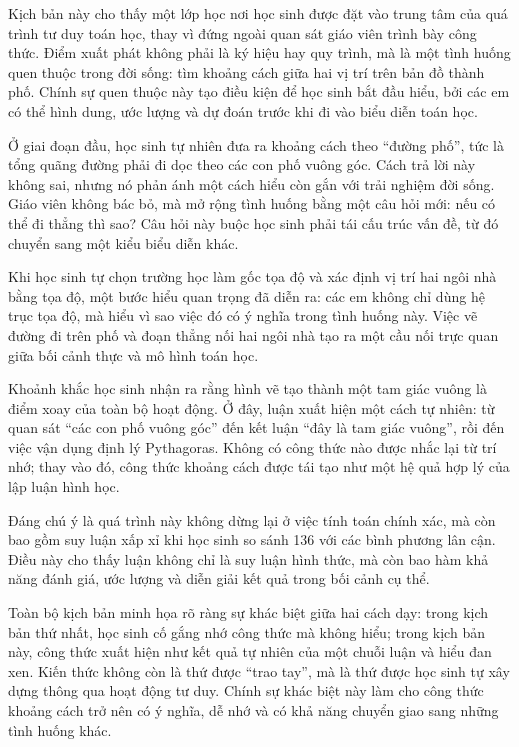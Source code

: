 \documentclass[
  10pt,
  a4paper,
  landscape,
  twoside,
  openany
]{scrbook}
\newcommand{\NOTE}[1]{#1}
\begin{document}
{
\NOTE{Kịch bản này cho thấy một lớp học nơi học sinh được đặt vào trung tâm của quá trình tư duy toán học, thay vì đứng ngoài quan sát giáo viên trình bày công thức. Điểm xuất phát không phải là ký hiệu hay quy trình, mà là một tình huống quen thuộc trong đời sống: tìm khoảng cách giữa hai vị trí trên bản đồ thành phố. Chính sự quen thuộc này tạo điều kiện để học sinh bắt đầu hiểu, bởi các em có thể hình dung, ước lượng và dự đoán trước khi đi vào biểu diễn toán học.

Ở giai đoạn đầu, học sinh tự nhiên đưa ra khoảng cách theo ``đường phố'', tức là tổng quãng đường phải đi dọc theo các con phố vuông góc. Cách trả lời này không sai, nhưng nó phản ánh một cách hiểu còn gắn với trải nghiệm đời sống. Giáo viên không bác bỏ, mà mở rộng tình huống bằng một câu hỏi mới: nếu có thể đi thẳng thì sao? Câu hỏi này buộc học sinh phải tái cấu trúc vấn đề, từ đó chuyển sang một kiểu biểu diễn khác.

Khi học sinh tự chọn trường học làm gốc tọa độ và xác định vị trí hai ngôi nhà bằng tọa độ, một bước hiểu quan trọng đã diễn ra: các em không chỉ dùng hệ trục tọa độ, mà hiểu vì sao việc đó có ý nghĩa trong tình huống này. Việc vẽ đường đi trên phố và đoạn thẳng nối hai ngôi nhà tạo ra một cầu nối trực quan giữa bối cảnh thực và mô hình toán học.

Khoảnh khắc học sinh nhận ra rằng hình vẽ tạo thành một tam giác vuông là điểm xoay của toàn bộ hoạt động. Ở đây, luận xuất hiện một cách tự nhiên: từ quan sát ``các con phố vuông góc'' đến kết luận ``đây là tam giác vuông'', rồi đến việc vận dụng định lý Pythagoras. Không có công thức nào được nhắc lại từ trí nhớ; thay vào đó, công thức khoảng cách được tái tạo như một hệ quả hợp lý của lập luận hình học.

Đáng chú ý là quá trình này không dừng lại ở việc tính toán chính xác, mà còn bao gồm suy luận xấp xỉ khi học sinh so sánh 136 với các bình phương lân cận. Điều này cho thấy luận không chỉ là suy luận hình thức, mà còn bao hàm khả năng đánh giá, ước lượng và diễn giải kết quả trong bối cảnh cụ thể.

Toàn bộ kịch bản minh họa rõ ràng sự khác biệt giữa hai cách dạy: trong kịch bản thứ nhất, học sinh cố gắng nhớ công thức mà không hiểu; trong kịch bản này, công thức xuất hiện như kết quả tự nhiên của một chuỗi luận và hiểu đan xen. Kiến thức không còn là thứ được ``trao tay'', mà là thứ được học sinh tự xây dựng thông qua hoạt động tư duy. Chính sự khác biệt này làm cho công thức khoảng cách trở nên có ý nghĩa, dễ nhớ và có khả năng chuyển giao sang những tình huống khác.}
}
\end{document}

